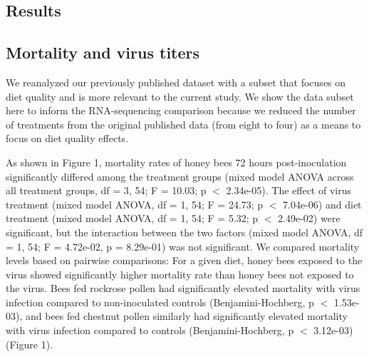 \documentclass{bmcart}
\begin{document}
\begin{linenumbers}
\begin{doublespacing}
\section*{Results}

\subsection*{Mortality and virus titers}

We reanalyzed our previously published dataset with a subset that focuses on diet quality and is more relevant to the current study. We show the data subset here to inform the RNA-sequencing comparison because we reduced the number of treatments from the original published data (from eight to four) \cite{adamInt} as a means to focus on diet quality effects.

As shown in Figure 1, mortality rates of honey bees 72 hours post-inoculation significantly differed among the treatment groups (mixed model ANOVA across all treatment groups, df = 3, 54; F = 10.03; p $<$ 2.34e-05). The effect of virus treatment (mixed model ANOVA, df = 1, 54; F = 24.73; p $<$ 7.04e-06) and diet treatment (mixed model ANOVA, df = 1, 54; F = 5.32; p $<$ 2.49e-02) were significant, but the interaction between the two factors (mixed model ANOVA, df = 1, 54; F = 4.72e-02, p = 8.29e-01) was not significant. We compared mortality levels based on pairwise comparisons: For a given diet, honey bees exposed to the virus showed significantly higher mortality rate than honey bees not exposed to the virus. Bees fed rockrose pollen had significantly elevated mortality with virus infection compared to non-inoculated controls (Benjamini-Hochberg, p $<$ 1.53e-03), and bees fed chestnut pollen similarly had significantly elevated mortality with virus infection compared to controls (Benjamini-Hochberg, p $<$ 3.12e-03) (Figure 1).


\end{doublespacing}
\end{linenumbers}
\end{document}
